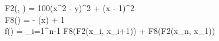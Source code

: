 F2(, ) = 100(x^2 - y)^2 + (x - 1)^2 \\
F8() =  - \cos(x) + 1 \\
f() = \sum_{i=1}^{n-1} F8(F2(x_i, x_{i+1})) + F8(F2(x_n, x_1))
